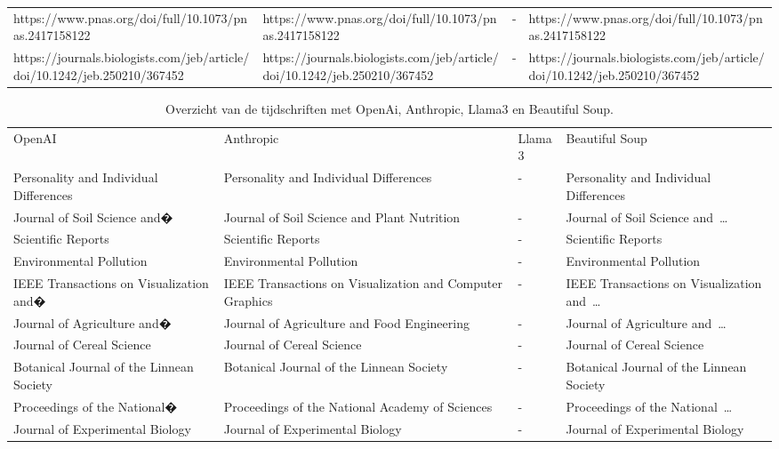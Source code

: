 \begin{table}[h!]
\begin{sideways}
\begin{tabularx}{\textwidth}{|X|X|p{1cm}|X|}
        https://www.pnas.org/doi/full/10.1073/\allowbreak pnas.2417158122 & https://www.pnas.org/doi/full/10.1073/\allowbreak pnas.2417158122 & - & https://www.pnas.org/doi/full/10.1073/\allowbreak pnas.2417158122\\
        https://journals.biologists.com/jeb/\allowbreak article/doi/10.1242/jeb.250210/367452 & https://journals.biologists.com/jeb/\allowbreak article/doi/10.1242/jeb.250210/367452 & - & https://journals.biologists.com/jeb/\allowbreak article/doi/10.1242/jeb.250210/367452\\
        \hline
    \end{tabularx}
\end{sideways}
    \label{table:llmUrl}
\end{table}
\begin{table}[h!]
    \tiny
    \caption{Overzicht van de tijdschriften met OpenAi, Anthropic, Llama3 en Beautiful Soup.}
    \centering
    \begin{sideways}
    \begin{tabularx}{\textwidth}{|X|X|p{1cm}|X|} 
        \hline
        \rowcolor{lightgray}
        \multicolumn{4}{|X|}{Tijdschrift}\\ 
        \hline
        \rowcolor{lightgray}
        OpenAI & Anthropic & Llama3 & Beautiful Soup \\ 
        \hline
        Personality and Individual Differences & Personality and Individual Differences & - & Personality and Individual Differences\\ 
        Journal of Soil Science and� & Journal of Soil Science and Plant Nutrition & - & Journal of Soil Science and …\\
        Scientific Reports & Scientific Reports & - & Scientific Reports\\
        Environmental Pollution & Environmental Pollution & - & Environmental Pollution\\
        IEEE Transactions on Visualization and� & IEEE Transactions on Visualization and Computer Graphics & - & IEEE Transactions on Visualization and …\\
        Journal of Agriculture and� & Journal of Agriculture and Food Engineering & - & Journal of Agriculture and …\\
        Journal of Cereal Science & Journal of Cereal Science & - & Journal of Cereal Science\\
        Botanical Journal of the Linnean Society & Botanical Journal of the Linnean Society & - & Botanical Journal of the Linnean Society\\
        Proceedings of the National� & Proceedings of the National Academy of Sciences & - & Proceedings of the National …\\
        Journal of Experimental Biology & Journal of Experimental Biology & - & Journal of Experimental Biology\\
        \hline
    \end{tabularx}
\end{sideways}
    \label{table:llmTijdschrift}
\end{table}
